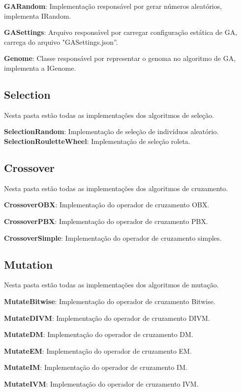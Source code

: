 \textbf{GARandom}: Implementação responsável por gerar números aleatórios, implementa IRandom.

\textbf{GASettings}: Arquivo responsável por carregar configuração estática de GA, carrega do arquivo "GASettings.json”.

\textbf{Genome}: Classe responsável por representar o genoma no algoritmo de GA, implementa a IGenome.


\subsection{Selection}

Nesta pasta estão todas as implementações dos algoritmos de seleção.

\textbf{SelectionRandom}: Implementação de seleção de indivíduos aleatório.
\textbf{SelectionRouletteWheel}: Implementação de seleção roleta.

\subsection{Crossover}

Nesta pasta estão todas as implementações dos algoritmos de cruzamento.

\textbf{CrossoverOBX}: Implementação do operador de cruzamento OBX.

\textbf{CrossoverPBX}: Implementação do operador de cruzamento PBX.

\textbf{CrossoverSimple}:  Implementação do operador de cruzamento simples.

\subsection{Mutation}

Nesta pasta estão todas as implementações dos algoritmos de mutação.

\textbf{MutateBitwise}: Implementação do operador de cruzamento Bitwise.

\textbf{MutateDIVM}: Implementação do operador de cruzamento DIVM.

\textbf{MutateDM}: Implementação do operador de cruzamento DM.

\textbf{MutateEM}: Implementação do operador de cruzamento EM.

\textbf{MutateIM}: Implementação do operador de cruzamento IM.

\textbf{MutateIVM}: Implementação do operador de cruzamento IVM.

